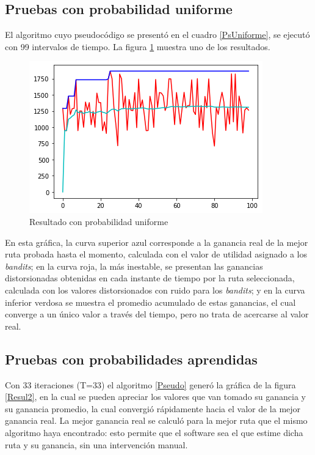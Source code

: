 \subsection{Pruebas con probabilidad uniforme}

El algoritmo cuyo pseudocódigo se presentó en el cuadro \ref{PsUniforme}, se ejecutó con 99 intervalos de tiempo. La figura \ref{fig:uniforme} muestra uno de los resultados. 

\begin{figure}[H]
	\centering
	\includegraphics[scale=1]{Uniforme}
	\caption{Resultado con probabilidad uniforme}
	\label{fig:uniforme}
\end{figure}

En esta gráfica, la curva superior azul corresponde a la ganancia real de la mejor ruta probada hasta el momento, calculada con el valor de utilidad asignado a los \textit{bandits}; en la curva roja, la más inestable, se presentan las ganancias distorsionadas obtenidas en cada instante de tiempo por la ruta seleccionada, calculada con los valores distorsionados con ruido para los \textit{bandits}; y en la curva inferior verdosa se muestra el promedio acumulado de estas ganancias, el cual converge a un único valor a través del tiempo, pero no trata de acercarse al valor real.

\subsection{Pruebas con probabilidades aprendidas}

Con 33 iteraciones (T=33) el algoritmo \ref{Pseudo} generó la gráfica de la figura \ref{Resul2}, en la cual se pueden apreciar los valores que van tomado su ganancia y su ganancia promedio, la cual convergió rápidamente hacia el valor de la mejor ganancia real. La mejor ganancia real se calculó para la mejor ruta que el mismo algoritmo haya encontrado: esto permite que el software sea el que estime dicha ruta y su ganancia, sin una intervención manual.

